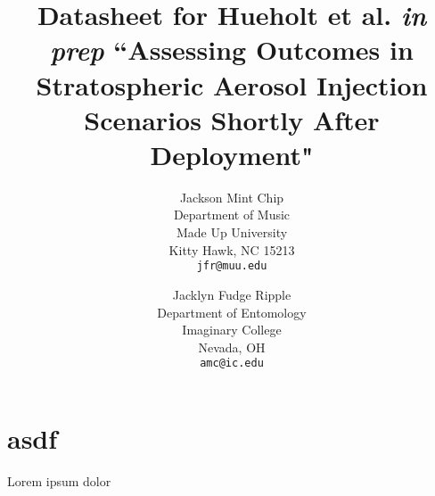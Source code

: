 \documentclass[]{DESDstyle}
\title{Datasheet for Hueholt et al. \textit{in prep} ``Assessing Outcomes in Stratospheric Aerosol Injection Scenarios Shortly After Deployment" \cite{hueholt_assessing_2022}}
\author{ Jackson Mint Chip \\
	Department of Music \\
	Made Up University\\
	Kitty Hawk, NC 15213 \\
	\texttt{jfr@muu.edu} \\
	\and
	Jacklyn Fudge Ripple \\
	Department of Entomology\\
	Imaginary College\\
	Nevada, OH \\
	\texttt{amc@ic.edu} \\
}
\begin{document}
\maketitle

\section{asdf}

Lorem ipsum dolor

\printbibliography
\end{document}
